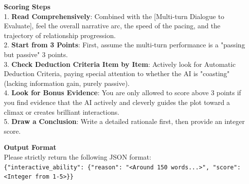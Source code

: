 \begin{tcolorbox}[
    breakable,
    colback=MyWordColor1,
    colframe=black,
    boxrule=0.6pt,
    arc=1.5mm,
    title={\textbf{DynSess-Eval Prompt: Interactive Ability}},
    fontupper=\small
]
\textbf{Scoring Steps}\\
1. \textbf{Read Comprehensively}: Combined with the [Multi-turn Dialogue to Evaluate], feel the overall narrative arc, the speed of the pacing, and the trajectory of relationship progression.\\
2. \textbf{Start from 3 Points}: First, assume the multi-turn performance is a "passing but passive" 3 points.\\
3. \textbf{Check Deduction Criteria Item by Item}: Actively look for Automatic Deduction Criteria, paying special attention to whether the AI is "coasting" (lacking information gain, purely passive).\\
4. \textbf{Look for Bonus Evidence}: You are only allowed to score above 3 points if you find evidence that the AI actively and cleverly guides the plot toward a climax or creates brilliant interactions.\\
5. \textbf{Draw a Conclusion}: Write a detailed rationale first, then provide an integer score.

\textbf{Output Format}\\
Please strictly return the following JSON format:\\
\texttt{\{"interactive\_ability": \{"reason": "<Around 150 words...>", "score": <Integer from 1-5>\}\}}
\end{tcolorbox}

